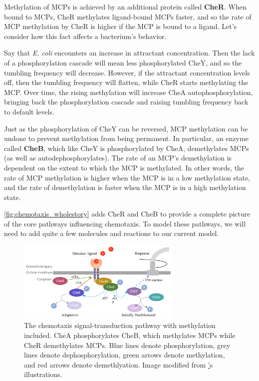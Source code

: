 Methylation of MCPs is achieved by an additional protein called \textbf{CheR}. When bound to MCPs, CheR methylates ligand-bound MCPs faster, and so the rate of MCP methylation by CheR is higher if the MCP is bound to a ligand. Let's consider how this fact affects a bacterium's behavior.

Say that \textit{E. coli} encounters an increase in attractant concentration. Then the lack of a phosphorylation cascade will mean less phosphorylated CheY, and so the tumbling frequency will decrease. However, if the attractant concentration levels off, then the tumbling frequency will flatten, while CheR starts methylating the MCP. Over time, the rising methylation will increase CheA autophosphorylation, bringing back the phosphorylation cascade and raising tumbling frequency back to default levels.

Just as the phosphorylation of CheY can be reversed, MCP methylation can be undone to prevent methylation from being permanent. In particular, an enzyme called \textbf{CheB}, which like CheY is phosphorylated by CheA, demethylates MCPs (as well as autodephosphorylates). The rate of an MCP's demethylation is dependent on the extent to which the MCP is methylated. In other words, the rate of MCP methylation is higher when the MCP is in a low methylation state, and the rate of demethylation is faster when the MCP is in a high methylation state.

\autoref{fig:chemotaxis_wholestory} adds CheR and CheB to provide a complete picture of the core pathways influencing chemotaxis. To model these pathways, we will need to add quite a few molecules and reactions to our current model.

\begin{figure}[h]
\centering
\mySfFamily
\includegraphics[width = 0.7\textwidth]{../images/chemotaxis_wholestory.png}
\caption{The chemotaxis signal-transduction pathway with methylation included. CheA phosphorylates CheB, which methylates MCPs while CheR demethylates MCPs. Blue lines denote phosphorylation, grey lines denote dephosphorylation, green arrows denote methylation, and red arrows denote demethlyation. Image modified from \href{http://chemotaxis.biology.utah.edu/Parkinson_Lab/projects/ecolichemotaxis/ecolichemotaxis.html}'s illustrations.}
\label{fig:chemotaxis_wholestory}
\end{figure}


